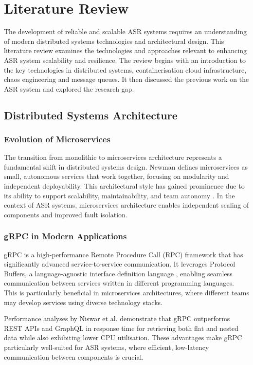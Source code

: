 \chapter{Literature Review} \label{chapter:literature_review}
The development of reliable and scalable ASR systems requires an understanding of modern distributed systems technologies and architectural design. This literature review examines the technologies and approaches relevant to enhancing ASR system scalability and resilience. The review begins with an introduction to the key technologies in distributed systems, containerisation cloud infrastructure, chaos engineering and message queues. It then discussed the previous work on the ASR system and explored the research gap.

\section{Distributed Systems Architecture}
\subsection{Evolution of Microservices}
The transition from monolithic to microservices architecture represents a fundamental shift in distributed systems design. Newman \cite{newman} defines microservices as small, autonomous services that work together, focusing on modularity and independent deployability. This architectural style has gained prominence due to its ability to support scalability, maintainability, and team autonomy \cite{microservices_benefits}. In the context of ASR systems, microservices architecture enables independent scaling of components and improved fault isolation.

\subsection{gRPC in Modern Applications}
gRPC is a high-performance Remote Procedure Call (RPC) framework \cite{grpc} that has significantly advanced service-to-service communication. It leverages Protocol Buffers, a language-agnostic interface definition language \cite{protocol_buffers}, enabling seamless communication between services written in different programming languages. This is particularly beneficial in microservices architectures, where different teams may develop services using diverse technology stacks. 

Performance analyses by Niswar et al. \cite{grpc_comparison} demonstrate that gRPC outperforms REST APIs and GraphQL in response time for retrieving both flat and nested data while also exhibiting lower CPU utilisation. These advantages make gRPC particularly well-suited for ASR systems, where efficient, low-latency communication between components is crucial.

